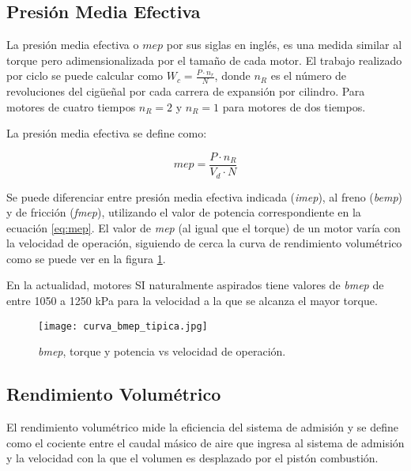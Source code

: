 
\subsection{Presión Media Efectiva}
%
La presión media efectiva o $mep$ por sus siglas en inglés, es una medida
similar al torque pero adimensionalizada por el tamaño de cada motor.
%
El trabajo realizado por ciclo se puede calcular como $W_c = \frac{P \cdot
n_r}{N}$, donde $n_R$ es el número de revoluciones del cigüeñal por cada
carrera de expansión por cilindro.
%
Para motores de cuatro tiempos $n_R=2$ y $n_R=1$ para motores de dos tiempos.

La presión media efectiva se define como:

\begin{equation}\label{eq:mep}
    mep = \frac{P \cdot n_R}{V_d \cdot N}
\end{equation}

Se puede diferenciar entre presión media efectiva indicada (\emph{imep}), al
freno (\emph{bemp}) y de fricción (\emph{fmep}), utilizando el valor de
potencia correspondiente en la ecuación \ref{eq:mep}.
%
El valor de \emph{mep} (al igual que el torque) de un motor varía con la
velocidad de operación, siguiendo de cerca la curva de rendimiento volumétrico
como se puede ver en la figura \ref{fig:bmep_tipica}.

En la actualidad, motores SI naturalmente aspirados tiene valores de
\emph{bmep} de entre 1050 a 1250 kPa para la velocidad a la que se alcanza el
mayor torque.

\begin{figure}
    \centering
    \texttt{[image: curva\_bmep\_tipica.jpg]}
    \caption{\emph{bmep}, torque y potencia vs velocidad de operación\parencite{heywood}.}
    \label{fig:bmep_tipica}
\end{figure}


\subsection{Rendimiento Volumétrico}
%
El rendimiento volumétrico mide la eficiencia del sistema de admisión y se
define como el cociente entre el caudal másico de aire que ingresa al sistema
de admisión y la velocidad con la que el volumen es desplazado por el pistón
combustión.

